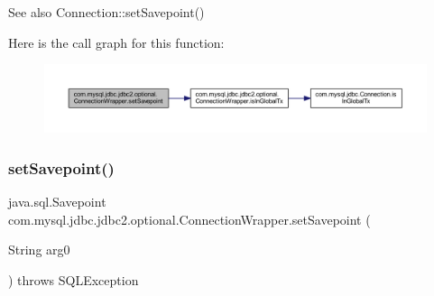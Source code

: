 \begin{DoxySeeAlso}{See also}
Connection\+::set\+Savepoint() 
\end{DoxySeeAlso}
Here is the call graph for this function\+:
\nopagebreak
\begin{figure}[H]
\begin{center}
\leavevmode
\includegraphics[width=350pt]{classcom_1_1mysql_1_1jdbc_1_1jdbc2_1_1optional_1_1_connection_wrapper_a6b97c71da72c7bb460e420e03078cb53_cgraph}
\end{center}
\end{figure}
\mbox{\label{classcom_1_1mysql_1_1jdbc_1_1jdbc2_1_1optional_1_1_connection_wrapper_ad8a366e0948f61c404409d7afdb45b31}} 
\subsubsection{\texorpdfstring{set\+Savepoint()}{setSavepoint()}\hspace{0.1cm}{\footnotesize\ttfamily [2/2]}}
{\footnotesize\ttfamily java.\+sql.\+Savepoint com.\+mysql.\+jdbc.\+jdbc2.\+optional.\+Connection\+Wrapper.\+set\+Savepoint (\begin{DoxyParamCaption}\item[{String}]{arg0 }\end{DoxyParamCaption}) throws S\+Q\+L\+Exception}

